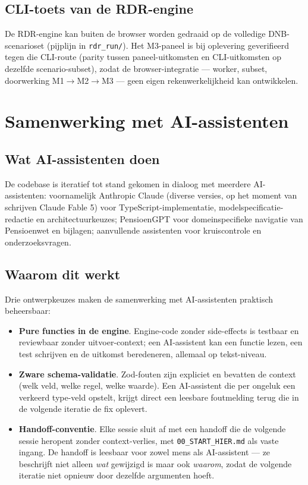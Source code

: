 \documentclass[11pt,a4paper]{article}
\newcommand{\code}[1]{\texttt{#1}}
\begin{document}
\subsection{CLI-toets van de RDR-engine}

De RDR-engine kan buiten de browser worden gedraaid op de volledige DNB-scenarioset (pijplijn in \code{rdr\_run/}). Het M3-paneel is bij oplevering geverifieerd tegen die CLI-route (parity tussen paneel-uitkomsten en CLI-uitkomsten op dezelfde scenario-subset), zodat de browser-integratie --- worker, subset, doorwerking M1$\rightarrow$M2$\rightarrow$M3 --- geen eigen rekenwerkelijkheid kan ontwikkelen.

\section{Samenwerking met AI-assistenten}
\label{sec:ai}

\subsection{Wat AI-assistenten doen}

De codebase is iteratief tot stand gekomen in dialoog met meerdere AI-assistenten: voornamelijk Anthropic Claude (diverse versies, op het moment van schrijven Claude Fable 5) voor TypeScript-implementatie, modelspecificatie-redactie en architectuurkeuzes; PensioenGPT voor domeinspecifieke navigatie van Pensioenwet en bijlagen; aanvullende assistenten voor kruiscontrole en onderzoeksvragen.

\subsection{Waarom dit werkt}

Drie ontwerpkeuzes maken de samenwerking met AI-assistenten praktisch beheersbaar:

\begin{itemize}
\item \textbf{Pure functies in de engine}. Engine-code zonder side-effects is testbaar en reviewbaar zonder uitvoer-context; een AI-assistent kan een functie lezen, een test schrijven en de uitkomst beredeneren, allemaal op tekst-niveau.
\item \textbf{Zware schema-validatie}. Zod-fouten zijn expliciet en bevatten de context (welk veld, welke regel, welke waarde). Een AI-assistent die per ongeluk een verkeerd type-veld opstelt, krijgt direct een leesbare foutmelding terug die in de volgende iteratie de fix oplevert.
\item \textbf{Handoff-conventie}. Elke sessie sluit af met een handoff die de volgende sessie heropent zonder context-verlies, met \code{00\_START\_HIER.md} als vaste ingang. De handoff is leesbaar voor zowel mens als AI-assistent --- ze beschrijft niet alleen \emph{wat} gewijzigd is maar ook \emph{waarom}, zodat de volgende iteratie niet opnieuw door dezelfde argumenten hoeft.
\end{itemize}
\end{document}

